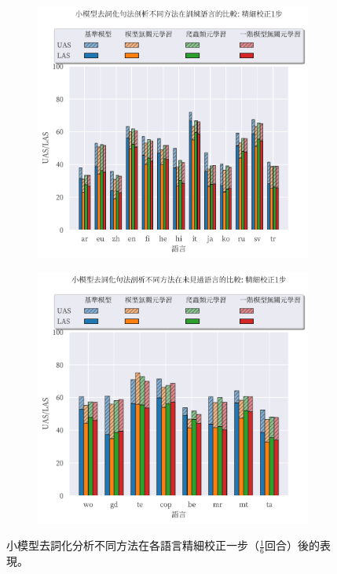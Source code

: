 \begin{figure}[htbp]
    \centering
    \begin{subfigure}[t]{0.8\textwidth}
        \centering
        \includegraphics[width=\textwidth]{figs/chapter3/delex/bar_small_one_step_train_langs.pdf}
    \end{subfigure}
    \vspace{-12pt}
    \begin{subfigure}[t]{0.8\textwidth}
        \centering
        \includegraphics[width=\textwidth]{figs/chapter3/delex/bar_small_one_step_test_langs.pdf}
    \end{subfigure}
    \caption{小模型去詞化分析不同方法在各語言精細校正一步（$\frac{1}{6}$回合）後的表現。}
    \label{fig:bar_small_one_step}
\end{figure}